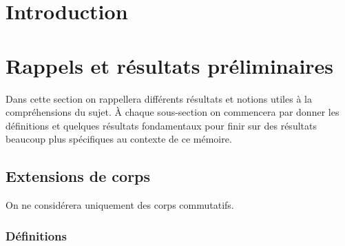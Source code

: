 \documentclass[a4paper]{article} %
\numberwithin{equation}{section}
\begin{document}
\newtheorem{thm}{Thèorème}[section]
\newtheorem{lem}[thm]{Lemme}
\newtheorem{cor}{Corollaire}[thm]
\newtheorem{prop}[thm]{Proposition}
\theoremstyle{definition}
\newtheorem{defn}[thm]{Définition}
\newtheorem*{ex}{Exemple}
\theoremstyle{remark}
\newtheorem{rem}{Remarque}[thm]
\section{Introduction}
\section{Rappels et résultats préliminaires}
Dans cette section on rappellera différents résultats et notions utiles à la compréhensions du sujet. À chaque sous-section on commencera par donner les définitions et quelques résultats fondamentaux pour finir sur des résultats beaucoup plus spécifiques au contexte de ce mémoire.
\subsection{Extensions de corps}
On ne considérera uniquement des corps commutatifs.
\subsubsection{Définitions}
\end{document}
